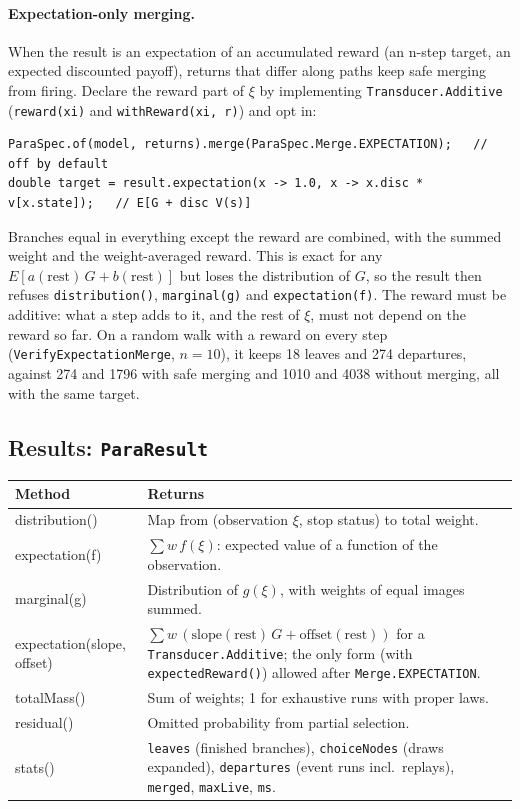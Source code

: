 \documentclass[11pt]{article}
\newcommand{\code}[1]{\texttt{#1}}
\begin{document}
\paragraph{Expectation-only merging.} When the result is an expectation of an accumulated reward (an n-step target, an
expected discounted payoff), returns that differ along paths keep safe merging from firing. Declare the reward part of
$\xi$ by implementing \code{Transducer.Additive} (\code{reward(xi)} and \code{withReward(xi, r)}) and opt in:
\begin{lstlisting}
ParaSpec.of(model, returns).merge(ParaSpec.Merge.EXPECTATION);   // off by default
double target = result.expectation(x -> 1.0, x -> x.disc * v[x.state]);   // E[G + disc V(s)]
\end{lstlisting}
Branches equal in everything except the reward are combined, with the summed weight and the weight-averaged reward.
This is exact for any $E[a(\text{rest})\,G+b(\text{rest})]$ but loses the distribution of $G$, so the result then refuses
\code{distribution()}, \code{marginal(g)} and \code{expectation(f)}. The reward must be additive: what a step adds to it,
and the rest of $\xi$, must not depend on the reward so far. On a random walk with a reward on every step
(\code{VerifyExpectationMerge}, $n=10$), it keeps 18 leaves and 274 departures, against 274 and 1796 with safe merging
and 1010 and 4038 without merging, all with the same target.

\subsection{Results: \code{ParaResult}}
\begin{center}
\begin{tabularx}{\linewidth}{@{}>{\ttfamily\small}p{5.0cm} Y@{}}
\toprule
\normalfont\textbf{Method} & \textbf{Returns}\\
\midrule
distribution() & Map from (observation $\xi$, stop status) to total weight.\\
expectation(f) & $\sum w\,f(\xi)$: expected value of a function of the observation.\\
marginal(g) & Distribution of $g(\xi)$, with weights of equal images summed.\\
expectation(slope, offset) & $\sum w\,(\text{slope}(\text{rest})\,G+\text{offset}(\text{rest}))$ for a \code{Transducer.Additive}; the only form (with \code{expectedReward()}) allowed after \code{Merge.EXPECTATION}.\\
totalMass() & Sum of weights; 1 for exhaustive runs with proper laws.\\
residual() & Omitted probability from partial selection.\\
stats() & \code{leaves} (finished branches), \code{choiceNodes} (draws expanded), \code{departures} (event runs incl.\ replays), \code{merged}, \code{maxLive}, \code{ms}.\\
\bottomrule
\end{tabularx}
\end{center}
\end{document}
